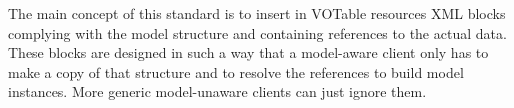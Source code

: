 The main concept of this standard is to insert in VOTable resources XML blocks complying with the 
model structure and containing references to the actual data.
These blocks are designed in such a way that a model-aware client only has to make a copy of that structure and to resolve the references  
to build model instances. More generic model-unaware clients can just ignore them. 



